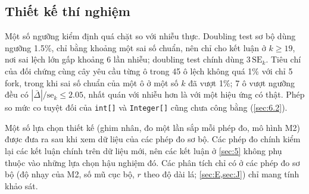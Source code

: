 \documentclass[12pt,a4paper]{article}
\begin{document}
\subsection{Thiết kế thí nghiệm}\label{sec:7.4}\label{sec:7.8}
Một số ngưỡng kiểm định quá chặt so với nhiễu thực. Doubling test sơ bộ dùng ngưỡng 1.5\%, chỉ bằng khoảng một sai số chuẩn, nên chỉ cho kết luận ở $k \ge 19$, nơi sai lệch lớn gấp khoảng 6 lần nhiễu; doubling test chính dùng $3\,\mathrm{SE}_k$. Tiêu chí của đối chứng cùng cây yêu cầu từng ô trong 45 ô lệch không quá 1\% với chỉ 5 fork, trong khi sai số chuẩn của một ô ở một số $k$ đã vượt 1\%; 7 ô vượt ngưỡng đều có $|\bar\Delta|/\mathrm{se}_k \le 2.05$, nhất quán với nhiễu hơn là với một hiệu ứng có thật. Phép so mức co tuyệt đối của \texttt{int[]} và \texttt{Integer[]} cũng chưa công bằng (\cref{sec:6.2}).

Một số lựa chọn thiết kế (ghim nhân, đo một lần sắp mỗi phép đo, mô hình M2) được đưa ra sau khi xem dữ liệu của các phép đo sơ bộ. Các phép đo chính kiểm lại các kết luận chính trên dữ liệu mới, nên các kết luận ở \cref{sec:5} không phụ thuộc vào những lựa chọn hậu nghiệm đó. Các phân tích chỉ có ở các phép đo sơ bộ (độ nhạy của M2, số mũ cục bộ, $r$ theo độ dài lá; \cref{sec:E,sec:J}) chỉ mang tính khảo sát.
\end{document}
